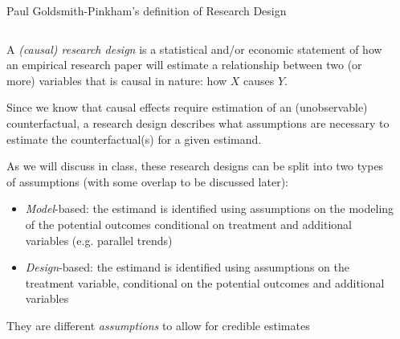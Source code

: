 \documentclass[notes,11pt, aspectratio=169]{beamer}
\newenvironment{wideitemize}{\itemize\addtolength{\itemsep}{10pt}}{\enditemize}
\begin{document}
\begin{frame}{Paul Goldsmith-Pinkham's definition of Research Design}
\begin{columns}[T] %
  \begin{column}{\textwidth}
    \begin{wideitemize}
    \item A \emph{(causal) research design} is a statistical and/or economic
      statement of how an empirical research paper will estimate a
      relationship between two (or more) variables that is causal in nature: how $X$ causes $Y$.

    \item Since we know that causal effects require estimation of an
      (unobservable) counterfactual, a research design describes what
      assumptions are necessary to estimate the counterfactual(s) for a
      given estimand.
      
    \item As we will discuss in class, these research designs can be
      split into two types of assumptions (with some overlap to be
      discussed later):
      \begin{itemize}
      \item \emph{Model}-based: the estimand is
        identified using assumptions on the modeling of the potential outcomes conditional on treatment and additional variables
         (e.g. parallel trends)
       \item\emph{Design}-based: the estimand is
         identified using assumptions on the treatment variable,
         conditional on the potential outcomes and additional
         variables
      \end{itemize}

      \item They are different \emph{assumptions} to allow for credible estimates
    \end{wideitemize}
\end{column}%
\hfill%
\begin{column}{.6\textwidth}
\end{column}%
\end{columns}
\end{frame}
\end{document}
